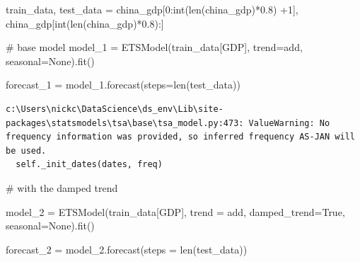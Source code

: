 \documentclass[
  11pt,
]{article}
\newenvironment{Shaded}{\begin{snugshade}}{\end{snugshade}}
\newcommand{\BuiltInTok}[1]{\textcolor[rgb]{0.00,0.23,0.31}{#1}}
\newcommand{\CommentTok}[1]{\textcolor[rgb]{0.37,0.37,0.37}{#1}}
\newcommand{\DecValTok}[1]{\textcolor[rgb]{0.68,0.00,0.00}{#1}}
\newcommand{\FloatTok}[1]{\textcolor[rgb]{0.68,0.00,0.00}{#1}}
\newcommand{\NormalTok}[1]{\textcolor[rgb]{0.00,0.23,0.31}{#1}}
\newcommand{\OperatorTok}[1]{\textcolor[rgb]{0.37,0.37,0.37}{#1}}
\newcommand{\StringTok}[1]{\textcolor[rgb]{0.13,0.47,0.30}{#1}}
\newcommand{\VariableTok}[1]{\textcolor[rgb]{0.07,0.07,0.07}{#1}}
\begin{document}
\begin{Shaded}
\begin{Highlighting}[]
\NormalTok{train\_data, test\_data }\OperatorTok{=}\NormalTok{ china\_gdp[}\DecValTok{0}\NormalTok{:}\BuiltInTok{int}\NormalTok{(}\BuiltInTok{len}\NormalTok{(china\_gdp)}\OperatorTok{*}\FloatTok{0.8}\NormalTok{) }\OperatorTok{+}\DecValTok{1}\NormalTok{], china\_gdp[}\BuiltInTok{int}\NormalTok{(}\BuiltInTok{len}\NormalTok{(china\_gdp)}\OperatorTok{*}\FloatTok{0.8}\NormalTok{):]}
\end{Highlighting}
\end{Shaded}

\begin{Shaded}
\begin{Highlighting}[]
\CommentTok{\# base model}
\NormalTok{model\_1 }\OperatorTok{=}\NormalTok{ ETSModel(train\_data[}\StringTok{\textquotesingle{}GDP\textquotesingle{}}\NormalTok{], trend}\OperatorTok{=}\StringTok{\textquotesingle{}add\textquotesingle{}}\NormalTok{, seasonal}\OperatorTok{=}\VariableTok{None}\NormalTok{).fit()}

\NormalTok{forecast\_1 }\OperatorTok{=}\NormalTok{ model\_1.forecast(steps}\OperatorTok{=}\BuiltInTok{len}\NormalTok{(test\_data))}
\end{Highlighting}
\end{Shaded}

\begin{verbatim}
c:\Users\nickc\DataScience\ds_env\Lib\site-packages\statsmodels\tsa\base\tsa_model.py:473: ValueWarning: No frequency information was provided, so inferred frequency AS-JAN will be used.
  self._init_dates(dates, freq)
\end{verbatim}

\begin{Shaded}
\begin{Highlighting}[]
\CommentTok{\# with the damped trend }

\NormalTok{model\_2 }\OperatorTok{=}\NormalTok{ ETSModel(train\_data[}\StringTok{\textquotesingle{}GDP\textquotesingle{}}\NormalTok{], trend }\OperatorTok{=} \StringTok{\textquotesingle{}add\textquotesingle{}}\NormalTok{, damped\_trend}\OperatorTok{=}\VariableTok{True}\NormalTok{, seasonal}\OperatorTok{=}\VariableTok{None}\NormalTok{).fit()}

\NormalTok{forecast\_2 }\OperatorTok{=}\NormalTok{ model\_2.forecast(steps }\OperatorTok{=} \BuiltInTok{len}\NormalTok{(test\_data))}
\end{Highlighting}
\end{Shaded}
\end{document}
